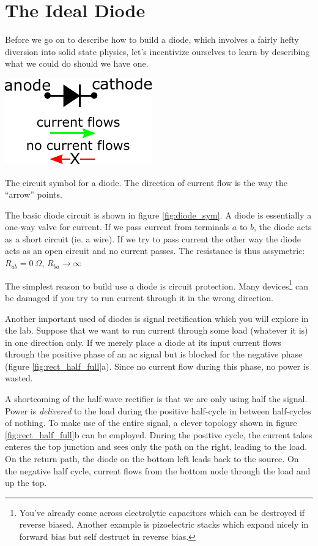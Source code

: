 \documentclass{tufte-book}
\begin{document}
\section{The Ideal Diode}
Before we go on to describe how to build a diode, which involves a fairly hefty diversion into solid state physics, let's incentivize ourselves to learn by describing what we could do should we have one. 

\begin{marginfigure}%
  \includegraphics[]{diodecurrentflow}
  \caption{The circuit symbol for a diode. The direction of current flow is the way the ``arrow'' points.}
  \label{fig:diode_sym}
\end{marginfigure}

The basic diode circuit is shown in figure \ref{fig:diode_sym}. A diode is essentially a one-way valve for current. If we pass current from terminals $a$ to $b$, the diode acts as a short circuit (ie. a wire). If we try to pass current the other way the diode acts as an open circuit and no current passes. The resistance is thus assymetric: $R_{ab} = 0~\Omega$, $R_{ba} \rightarrow \infty$

The simplest reason to build use a diode is circuit protection. Many devices\footnote{You've already come across electrolytic capacitors which can be destroyed if reverse biased. Another example is pizoelectric stacks which expand nicely in forward bias but self destruct in reverse bias.} can be damaged if you try to run current through it in the wrong direction. 

Another important used of diodes is signal rectification which you will explore in the lab. Suppose that we want to run current through some load (whatever it is) in one direction only. If we merely place a diode at its input current flows through the positive phase of an ac signal but is blocked for the negative phase (figure \ref{fig:rect_half_full}a). Since no current flow during this phase, no power is wasted. 

A shortcoming of the half-wave rectifier is that we are only using half the signal. Power is \textit{delivered} to the load during the positive half-cycle in between half-cycles of nothing. To make use of the entire signal, a clever topology shown in figure \ref{fig:rect_half_full}b can be employed. During the positive cycle, the current takes enteres the top junction and sees only the path on the right, leading to the load. On the return path, the diode on the bottom left leads back to the source. On the negative half cycle, current flows from the bottom node through the load and up the top.
\end{document}
